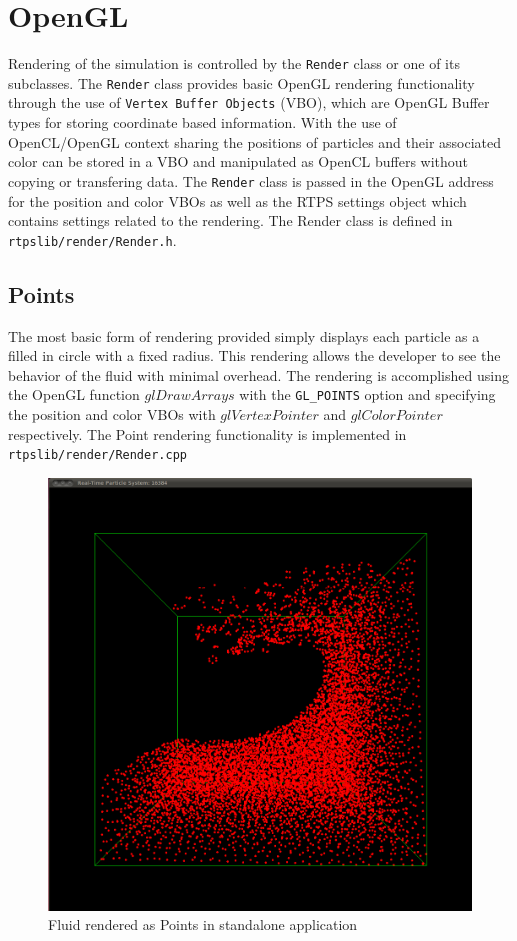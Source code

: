 \section{OpenGL}

Rendering of the simulation is controlled by the \verb|Render| class or one of
its subclasses. The \verb|Render| class provides basic OpenGL rendering
functionality through the use of \verb|Vertex Buffer Objects| (VBO), which are OpenGL
Buffer types for storing coordinate based information. With the use of
OpenCL/OpenGL context sharing the positions of particles and their associated
color can be stored in a VBO and manipulated as OpenCL buffers without copying
or transfering data. The \verb|Render| class is passed in the OpenGL address
for the position and color VBOs as well as the RTPS settings object which
contains settings related to the rendering. The Render class is defined in
\verb|rtpslib/render/Render.h|.


\subsection{Points}
The most basic form of rendering provided simply displays each particle as a
filled in circle with a fixed radius. This rendering allows the developer to
see the behavior of the fluid with minimal overhead. The rendering is
accomplished using the OpenGL function $glDrawArrays$ with the \verb|GL_POINTS|
option and specifying the position and color VBOs with $glVertexPointer$ and
$glColorPointer$ respectively. The Point rendering functionality is implemented
in \verb|rtpslib/render/Render.cpp|

\begin{figure}[!htc]
 		\centering
		\includegraphics[scale=0.2]{figures/standalone.png}
        \caption{ Fluid rendered as Points in standalone application }
		\label{fig:points}
\end{figure}




